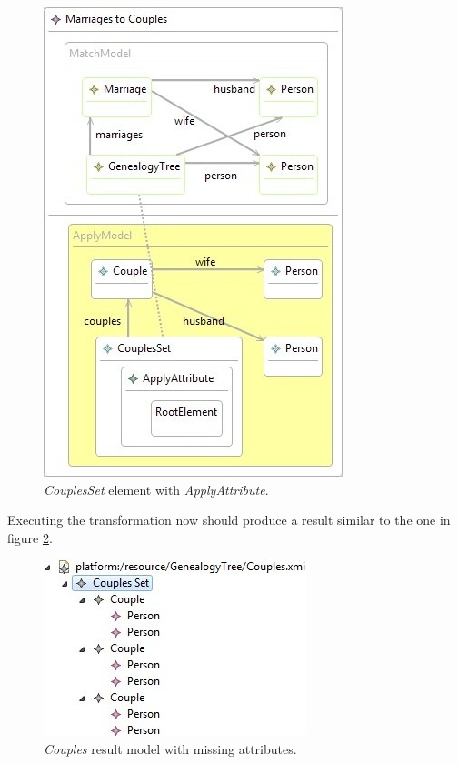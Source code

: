 \begin{figure}[h]
\begin{center}
  \includegraphics[scale=0.7]{imgs/second_layer_rule_with_apply_attr.jpg}
  \caption{\emph{CouplesSet} element with \emph{ApplyAttribute}.}
  \label{fig:second_layer_rule_with_apply_attr}
\end{center}
\end{figure}

Executing the transformation now should produce a result similar to the one in
figure \ref{fig:result_without_attributes}.

\begin{figure}[h]
\begin{center}
  \includegraphics[scale=0.7]{imgs/result_without_attributes.jpg}
  \caption{\emph{Couples} result model with missing attributes.}
  \label{fig:result_without_attributes}
\end{center}
\end{figure}

